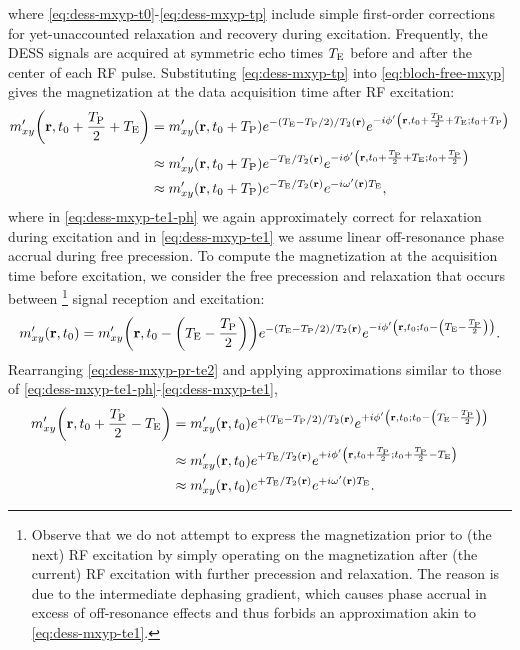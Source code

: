 where \eqref{eq:dess-mxyp-t0}-\eqref{eq:dess-mxyp-tp}
include simple first-order corrections
for yet-unaccounted relaxation and recovery
during excitation.
Frequently, 
the DESS signals are acquired 
at symmetric echo times $T_\mathrm{E}$
before and after the center of each RF pulse.
Substituting \eqref{eq:dess-mxyp-tp} 
into \eqref{eq:bloch-free-mxyp}
gives the magnetization
at the data acquisition time
after RF excitation:
\begin{align}
	\mxyp\paren{\bmr,t_0+\frac{\TP}{2}+\TE} 
		&= \mxyp\paren{\bmr,t_0+\TP} e^{-\paren{\TE-\TP/2}/\Tt\pr} 
			e^{-i\php\paren{\bmr,t_0+\frac{\TP}{2}+\TE;t_0+\TP}} \nonumber \\
		&\approx \mxyp\paren{\bmr,t_0+\TP} e^{-\TE/\Tt\pr} 
			e^{-i\php\paren{\bmr,t_0+\frac{\TP}{2}+\TE;t_0+\frac{\TP}{2}}}
			\label{eq:dess-mxyp-te1-ph} \\
		&\approx \mxyp\paren{\bmr,t_0+\TP} e^{-\TE/\Tt\pr} e^{-i\omp\pr\TE},	
			\label{eq:dess-mxyp-te1}
\end{align}
where in \eqref{eq:dess-mxyp-te1-ph}
we again approximately correct
for relaxation during excitation
and in \eqref{eq:dess-mxyp-te1}
we assume linear off-resonance phase accrual 
during free precession.
To compute the magnetization
at the acquisition time 
before excitation,
we consider the free precession and relaxation
that occurs between 
\footnote{Observe that we do not attempt
to express the magnetization 
prior to (the next) RF excitation
by simply operating on the magnetization after (the current) RF excitation
with further precession and relaxation.
The reason is due to the intermediate dephasing gradient,
which causes phase accrual
in excess of off-resonance effects
and thus forbids an approximation akin to \eqref{eq:dess-mxyp-te1}.
}
signal reception and excitation:
\begin{align}
	\mxyp\paren{\bmr,t_0} =
		\mxyp\paren{\bmr,t_0-\paren{\TE-\frac{\TP}{2}}} e^{-\paren{\TE-\TP/2}/\Tt\pr} e^{-i\php\paren{\bmr,t_0;t_0-\paren{\TE-\frac{\TP}{2}}}}.
		\label{eq:dess-mxyp-pr-te2}
\end{align}
Rearranging \eqref{eq:dess-mxyp-pr-te2} 
and applying approximations
similar to those of 
\eqref{eq:dess-mxyp-te1-ph}-\eqref{eq:dess-mxyp-te1},
\begin{align}
	\mxyp\paren{\bmr,t_0+\frac{\TP}{2}-\TE} 
		&= \mxyp\paren{\bmr,t_0} e^{+\paren{\TE-\TP/2}/\Tt\pr} 
			e^{+i\php\paren{\bmr,t_0;t_0-\paren{\TE-\frac{\TP}{2}}}} \nonumber \\
		&\approx \mxyp\paren{\bmr,t_0} e^{+\TE/\Tt\pr} 
			e^{+i\php\paren{\bmr,t_0+\frac{\TP}{2};t_0+\frac{\TP}{2}-\TE}}
			\label{eq:dess-mxyp-te2-ph} \\
		&\approx \mxyp\paren{\bmr,t_0} e^{+\TE/\Tt\pr} e^{+i\omp\pr\TE}.	
			\label{eq:dess-mxyp-te2}
\end{align}

